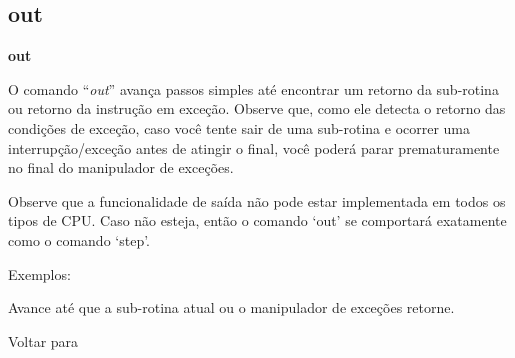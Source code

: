 \documentclass[letterpaper,10pt,brazil]{sphinxmanual}
\begin{document}
\subsection{out}
\label{debugger/execution:debugger-command-out}\label{debugger/execution:out}
\begin{DUlineblock}{0em}
\item[]
\begin{DUlineblock}{\DUlineblockindent}
\item[] \textbf{out}
\item[] 
\end{DUlineblock}
\item[] O comando ``\emph{out}'' avança passos simples até encontrar um retorno da sub-rotina ou retorno da instrução em exceção. Observe que, como ele detecta o retorno das condições de exceção, caso você tente sair de uma sub-rotina e ocorrer uma interrupção/exceção antes de atingir o final, você poderá parar prematuramente no final do manipulador de exceções.
\item[] 
\item[] Observe que a funcionalidade de saída não pode estar implementada em todos os tipos de CPU. Caso não esteja, então o comando `out' se comportará exatamente como o comando `step'.
\item[] 
\item[] Exemplos:
\item[] 
\item[]
\begin{DUlineblock}{\DUlineblockindent}
\item[] 
\item[] 
\end{DUlineblock}
\item[] Avance até que a sub-rotina atual ou o manipulador de exceções retorne.
\item[] 
\item[] Voltar para {\hyperref[debugger/execution:debugger\string-execution\string-list]{}}
\end{DUlineblock}
\begin{quote}
\label{debugger/execution:debugger-command-go}\end{quote}
\end{document}

